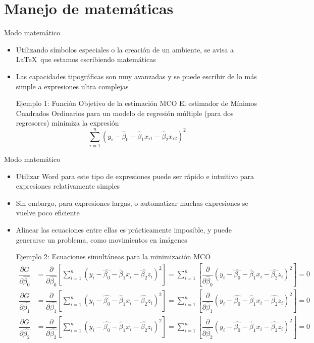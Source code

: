 \documentclass{beamer}
\begin{document}
    \section{Manejo de matemáticas}
    \begin{frame}{Modo matemático}
    \begin{itemize}
    \item Utilizando símbolos especiales o la creación de un ambiente, se avisa a \LaTeX\  que estamos escribiendo matemáticas
    \item Las capacidades tipográficas son muy avanzadas y se puede escribir de lo más simple a expresiones ultra complejas
    \begin{block}{Ejemplo 1: Función Objetivo de la estimación MCO}
    El estimador de Mínimos Cuadrados Ordinarios para un modelo de regresión múltiple (para dos regresores) minimiza la expresión
    $$\displaystyle{\sum_{i=1}^{n} \left( y_i -\hat{\beta}_0-\hat{\beta}_1 x_{i1}-\hat{\beta}_2 x_{i2}\right)^2  }$$
    \end{block}
        \end{itemize}
    \end{frame}
 \begin{frame}{Modo matemático}
 \begin{itemize}

     \item Utilizar Word para este tipo de expresiones puede ser rápido e intuitivo para expresiones relativamente simples
     \item Sin embargo, para expresiones largas, o automatizar muchas expresiones  se vuelve poco eficiente
     \item Alinear las ecuaciones entre ellas es prácticamente imposible, y puede generarse un problema, como movimientos en imágenes
    \begin{block}{Ejemplo 2: Ecuaciones simultáneas para la minimización MCO}
    \tiny
    \begin{align*}
    \dfrac{\partial G}{\partial \hat{\beta_0}}&= \dfrac{\partial}{\partial \hat{\beta_0}}\left[ \sum_{i=1}^n \left(y_i-\hat{\beta_0}-\hat{\beta}_1x_i- \hat{\beta_2} z_i\right)^2 \right]= \sum_{i=1}^n\left[ \dfrac{\partial}{\partial\hat{\beta}_0} \left(y_i-\hat{\beta_0}-\hat{\beta}_1x_i- \hat{\beta_2} z_i \right)^2\right]=0\\
\dfrac{\partial G}{\partial \hat{\beta_1}}&=
       \dfrac{\partial}{\partial \hat{\beta_1}} \left[ \sum_{i=1}^n \left(y_i-\hat{\beta_0}-\hat{\beta}_1x_i- \hat{\beta_2} z_i\right)^2\right]=\sum_{i=1}^n\left[ \dfrac{\partial}{\partial\hat{\beta}_1} \left(y_i-\hat{\beta_0}-\hat{\beta}_1x_i- \hat{\beta_2} z_i \right)^2\right]=0\\
          \dfrac{\partial G}{\partial \hat{\beta_2}}&= \dfrac{\partial}{\partial \hat{\beta_2}} \left[ \sum_{i=1}^n \left( y_i-\hat{\beta_0}-\hat{\beta}_1x_i- \hat{\beta_2} z_i\right) ^2 \right]=\sum_{i=1}^n\left[ \dfrac{\partial}{\partial\hat{\beta}_2} \left(y_i-\hat{\beta_0}-\hat{\beta}_1x_i- \hat{\beta_2} z_i \right)^2\right]=0
    \end{align*}
    \end{block}
     \end{itemize}
 \end{frame}
\end{document}
